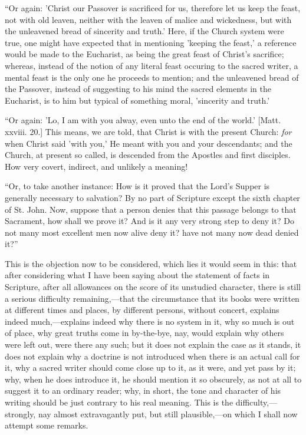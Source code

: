 ``Or again: 'Christ our Passover is sacrificed for us,
therefore let us keep the feast, not with old leaven, neither with the
leaven of malice and wickedness, but with the unleavened bread of
sincerity and truth.' Here, if the Church system were true, one might
have expected that in mentioning 'keeping the feast,' a reference
would be made to the Eucharist, as being the great feast of Christ's
sacrifice; whereas, instead of the notion of any literal feast
occuring to the sacred writer, a mental feast is the only one he
proceeds to mention; and the unleavened bread of the Passover, instead
of suggesting to his mind the sacred elements in the Eucharist, is to
him but typical of something moral, 'sincerity and truth.'

``Or again: 'Lo, I am with you alway, even unto the end of the
world.' [Matt. xxviii. 20.] This means, we are told, that Christ is
with the present Church: \emph{for} when Christ said 'with you,' He
meant with you and your descendants; and the Church, at present so
called, is descended from the Apostles and first disciples. How very
covert, indirect, and unlikely a meaning!

``Or, to take another instance: How is it proved that the Lord's
Supper is generally necessary to salvation? By no part of Scripture
except the sixth chapter of St. John. Now, suppose that a person
denies that this passage belongs to that Sacrament, how shall we prove
it? And is it any very strong step to deny it? Do not many most
excellent men now alive deny it? have not many now dead denied
it?''

This is the objection now to be considered, which lies it would
seem in this: that after considering what I have been saying about the
statement of facts in Scripture, after all allowances on the score of
its unstudied character, there is still a serious difficulty
remaining,—that the circumstance that its books were written at
different times and places, by different persons, without concert,
explains indeed much,—explains indeed why there is no system in it,
why so much is out of place, why great truths come in by-the-bye, nay,
would explain why others were left out, were there any such; but it
does not explain the case as it stands, it does not explain why a
doctrine is not introduced when there is an actual call for it, why a
sacred writer should come close up to it, as it were, and yet pass by
it; why, when he does introduce it, he should mention it so obscurely,
as not at all to suggest it to an ordinary reader; why, in short, the
tone and character of his writing should be just contrary to his real
meaning. This is the difficulty,—strongly, nay almost extravagantly
put, but still plausible,—on which I shall now attempt some remarks.

